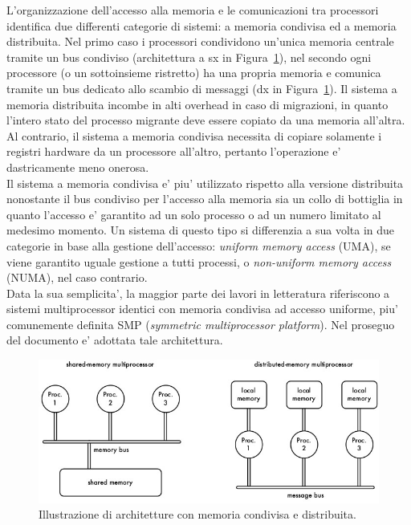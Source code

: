 L'organizzazione dell'accesso alla memoria e le comunicazioni tra processori identifica due differenti categorie di sistemi: a memoria condivisa ed a memoria distribuita. Nel primo caso i processori condividono un'unica memoria centrale tramite un bus condiviso (architettura a sx in Figura~\ref{fig:memory}), nel secondo ogni processore (o un sottoinsieme ristretto) ha una propria memoria e comunica tramite un bus dedicato allo scambio di messaggi (dx in Figura~\ref{fig:memory}). Il sistema a memoria distribuita incombe in alti overhead in caso di migrazioni, in quanto l'intero stato del processo migrante deve essere copiato da una memoria all'altra. Al contrario, il sistema a memoria condivisa necessita di copiare solamente i registri hardware da un processore all'altro, pertanto l'operazione e' dastricamente meno onerosa.\\
Il sistema a memoria condivisa e' piu' utilizzato rispetto alla versione distribuita nonostante il bus condiviso per l'accesso alla memoria sia un collo di bottiglia in quanto l'accesso e' garantito ad un solo processo o ad un numero limitato al medesimo momento. Un sistema di questo tipo si differenzia a sua volta in due categorie in base alla gestione dell'accesso: \textit{uniform memory access} (UMA), se viene garantito uguale gestione a tutti processi, o \textit{non-uniform memory access} (NUMA), nel caso contrario.\\

Data la sua semplicita', la maggior parte dei lavori in letteratura riferiscono a sistemi multiprocessor identici con memoria condivisa ad accesso uniforme, piu' comunemente definita SMP (\textit{symmetric multiprocessor platform}). Nel proseguo del documento e' adottata tale architettura.

\begin{figure}
\includegraphics[width=\linewidth]{images/memory_arch.jpeg}
\caption{Illustrazione di architetture con memoria condivisa e distribuita.}
\label{fig:memory}
\end{figure}


